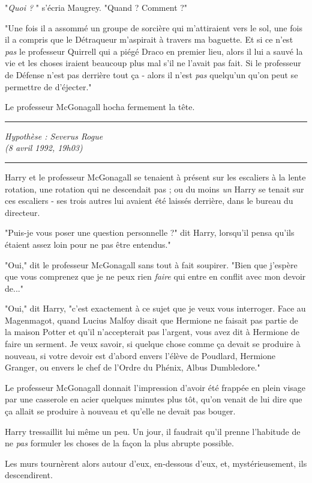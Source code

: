 "\emph{Quoi ?} " s'écria Maugrey. "Quand ? Comment ?"

"Une fois il a assommé un groupe de sorcière qui m'attiraient vers le sol, une fois il a compris que le Détraqueur m'aspirait à travers ma baguette. Et si ce n'est \emph{pas}  le professeur Quirrell qui a piégé Draco en premier lieu, alors il lui a sauvé la vie et les choses iraient beaucoup plus mal s'il ne l'avait pas fait. Si le professeur de Défense n'est pas derrière tout ça - alors il n'est \emph{pas } quelqu'un qu'on peut se permettre de d'éjecter."

Le professeur McGonagall hocha fermement la tête.
\par\noindent\rule{\textwidth}{0.4pt}
\emph{Hypothèse : Severus Rogue} \\\emph{(8 avril 1992, 19h03)} 
\par\noindent\rule{\textwidth}{0.4pt}
Harry et le professeur McGonagall se tenaient à présent sur les escaliers à la lente rotation, une rotation qui ne descendait pas ; ou du moins \emph{un } Harry se tenait sur ces escaliers - ses trois autres lui avaient été laissés derrière, dans le bureau du directeur.

"Puis-je vous poser une question personnelle ?" dit Harry, lorsqu'il pensa qu'ils étaient assez loin pour ne pas être entendus."

"Oui," dit le professeur McGonagall sans tout à fait soupirer. "Bien que j'espère que vous comprenez que je ne peux rien \emph{faire}  qui entre en conflit avec mon devoir de..."

"Oui," dit Harry, "c'est exactement à ce sujet que je veux vous interroger. Face au Magenmagot, quand Lucius Malfoy disait que Hermione ne faisait pas partie de la maison Potter et qu'il n'accepterait pas l'argent, vous avez dit à Hermione de faire un serment. Je veux savoir, si quelque chose comme ça devait se produire à nouveau, si votre devoir est d'abord envers l'élève de Poudlard, Hermione Granger, ou envers le chef de l'Ordre du Phénix, Albus Dumbledore."

Le professeur McGonagall donnait l'impression d'avoir été frappée en plein visage par une casserole en acier quelques minutes plus tôt, qu'on venait de lui dire que ça allait se produire à nouveau et qu'elle ne devait pas bouger.

Harry tressaillit lui même un peu. Un jour, il faudrait qu'il prenne l'habitude de ne \emph{pas}  formuler les choses de la façon la plus abrupte possible.

Les murs tournèrent alors autour d'eux, en-dessous d'eux, et, mystérieusement, ils descendirent.

